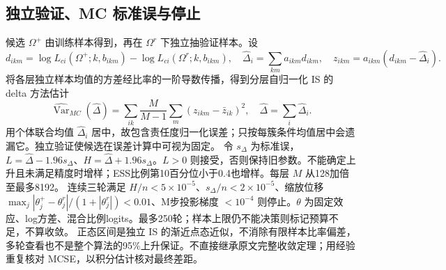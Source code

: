 \documentclass[UTF8,a4paper,11pt,fontset=fandol]{ctexart}
\begin{document}
\subsection{独立验证、MC 标准误与停止}
候选 $\Omega^+$ 由训练样本得到，再在 $\Omega^r$ 下独立抽验证样本。设
\[
d_{ikm}=\log L_{ci}(\Omega^+;k,b_{ikm})-\log L_{ci}(\Omega^r;k,b_{ikm}),\quad
\widehat\Delta_i=\sum_{km}a_{ikm}d_{ikm},\quad z_{ikm}=a_{ikm}(d_{ikm}-\widehat\Delta_i).
\]
将各层独立样本均值的方差经比率的一阶导数传播，得到分层自归一化 IS 的 delta 方法估计
\begin{equation}
\widehat{\operatorname{Var}}_{MC}(\widehat\Delta)
=\sum_{ik}\frac{M}{M-1}\sum_m(z_{ikm}-\bar z_{ik})^2,\quad
\widehat\Delta=\sum_i\widehat\Delta_i.
\end{equation}
用个体联合均值 $\widehat\Delta_i$ 居中，故包含责任度归一化误差；只按每簇条件均值居中会遗漏它。独立验证使候选在误差计算中可视为固定。
令 $s_\Delta$ 为标准误，$L=\widehat\Delta-1.96s_\Delta$、$H=\widehat\Delta+1.96s_\Delta$。$L>0$ 则接受，否则保持旧参数。不能确定上升且未满足精度时增样；ESS比例第10百分位小于0.4也增样。每层 $M$ 从128加倍至最多8192。
连续三轮满足 $H/n<5\times10^{-5}$、$s_\Delta/n<2\times10^{-5}$、缩放位移 $\max_j|\theta_j^+-\theta_j^r|/(1+|\theta_j^r|)<0.01$、M步投影梯度 $<10^{-4}$ 则停止。$\theta$ 为固定效应、log方差、混合比例logits。最多250轮；样本上限仍不能决策则标记预算不足，不算收敛。
正态区间是独立 IS 的渐近点态近似，不消除有限样本比率偏差，多轮查看也不是整个算法的95\%上升保证。不直接继承原文完整收敛定理；用经验重复核对 MCSE，以积分估计核对最终差距。
\end{document}
